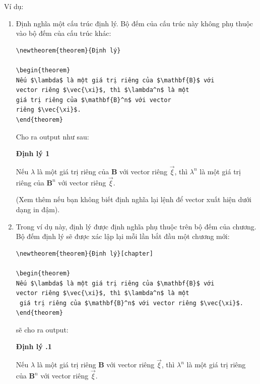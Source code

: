 \documentclass[a4paper]{report}
\begin{document}
Ví dụ:
\begin{enumerate}
\item Định nghĩa một cấu trúc định lý.  Bộ đếm của cấu trúc này không phụ thuộc vào bộ đếm của cấu trúc khác:

\begin{code}
\begin{verbatim}
\newtheorem{theorem}{Định lý}

\begin{theorem}
Nếu $\lambda$ là một giá trị riêng của $\mathbf{B}$ với 
vector riêng $\vec{\xi}$, thì $\lambda^n$ là một 
giá trị riêng của $\mathbf{B}^n$ với vector 
riêng $\vec{\xi}$.
\end{theorem}
\end{verbatim}
\end{code}%
Cho ra output như sau:
\begin{result}
\textbf{Định lý 1}
\begin{itshape}
Nếu $\lambda$ là một giá trị riêng của $\mathbf{B}$ với vector riêng $\vec{\xi}$, thì
$\lambda^n$ là một giá trị riêng của $\mathbf{B}^n$ với vector riêng $\vec{\xi}$.
\end{itshape}
\end{result}%
(Xem thêm   nếu bạn không biết định nghĩa lại lệnh   để vector xuất hiện dưới dạng in đậm).

\item  Trong ví dụ này, định lý được định nghĩa phụ thuộc trên bộ đếm của chương.
Bộ đếm định lý sẽ được xác lập lại mỗi lần bắt đầu một chương mới:

\begin{code}
\begin{verbatim}
\newtheorem{theorem}{Định lý}[chapter]

\begin{theorem}
Nếu $\lambda$ là một giá trị riêng của $\mathbf{B}$ với 
vector riêng $\vec{\xi}$, thì $\lambda^n$ là một
 giá trị riêng của $\mathbf{B}^n$ với vector riêng $\vec{\xi}$.
\end{theorem}
\end{verbatim}
\end{code}%
sẽ cho ra output:
\begin{result}
\textbf{Định lý \thechapter.1}
\begin{itshape}
Nếu $\lambda$ là một giá trị riêng $\mathbf{B}$ với vector riêng $\vec{\xi}$, thì
$\lambda^n$ là một giá trị riêng của $\mathbf{B}^n$ với vector riêng $\vec{\xi}$.
\end{itshape}
\end{result}


\end{enumerate}
\end{document}
